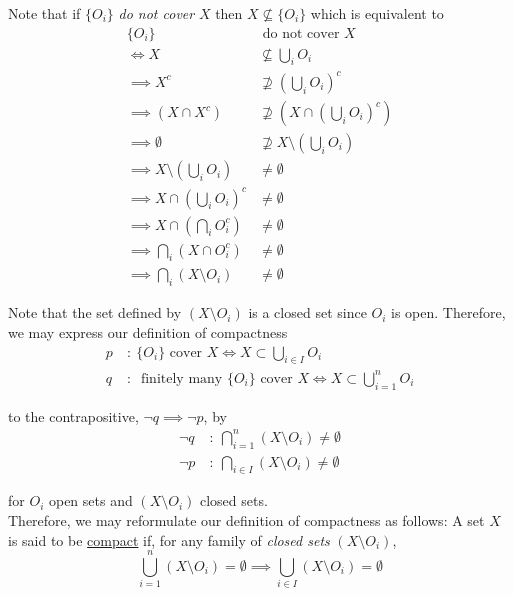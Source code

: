 \documentclass[12pt]{article}
\newlength\tindent
\renewcommand{\indent}{\hspace*{\tindent}}
\begin{document}
Note that if $\{O_i\}$ {\em do not cover} $X$ then $X \nsubseteq \{O_i\}$ which is equivalent to
\begin{align*}
	\{O_i\} &\text{ do not cover $X$} \\
	\iff X &\nsubseteq \bigcup_i O_i \\
	\implies X^c &\nsupseteq \left( \bigcup_i O_i \right)^c \\
	\implies \left(X \cap X^c\right) &\nsupseteq \left( X \cap \left( \bigcup_i O_i \right)^c \right) \\
	\implies \emptyset &\nsupseteq X \setminus \left( \bigcup_i O_i \right) \\
	\implies X \setminus \left( \bigcup_i O_i \right) &\neq \emptyset \\
	\implies X \cap \left( \bigcup_i O_i \right)^c &\neq \emptyset \\
	\implies X \cap \left( \bigcap_i O_i^c \right) &\neq \emptyset \\
	\implies \bigcap_i \left( X \cap O_i^c \right) &\neq \emptyset \\
	\implies \bigcap_i \left( X \setminus O_i \right) &\neq \emptyset 
\end{align*}

\indent Note that the set defined by $\left( X \setminus O_i \right)$ is a closed set since $O_i$ is open. Therefore, we may express our definition of compactness
\begin{align*}
	p ~&:~ \{O_i\} \text{ cover $X$} \iff X \subset \bigcup_{i\in I} O_i \\
	q ~&:~ \text{ finitely many $\{O_i\}$ cover $X$} \iff X \subset \bigcup^n_{i = 1} O_i
\end{align*}

to the contrapositive, $\neg q \implies \neg p$, by
\begin{align*}
	\neg q ~&:~ \bigcap^n_{i = 1} \left( X \setminus O_i \right) \neq \emptyset \\
	\neg p ~&:~ \bigcap_{i \in I} \left( X \setminus O_i \right) \neq \emptyset 
\end{align*}

for $O_i$ open sets and $\left( X \setminus O_i \right)$ closed sets. \\

\indent Therefore, we may reformulate our definition of compactness as follows: A set $X$ is said to be \underline{compact} if, for any family of {\em closed sets} $\left( X \setminus O_i \right)$, 
\begin{equation*}
	\bigcup^n_{i = 1} \left( X \setminus O_i \right) = \emptyset \implies \bigcup_{i \in I} \left( X \setminus O_i \right) = \emptyset
\end{equation*} 
\end{document}
